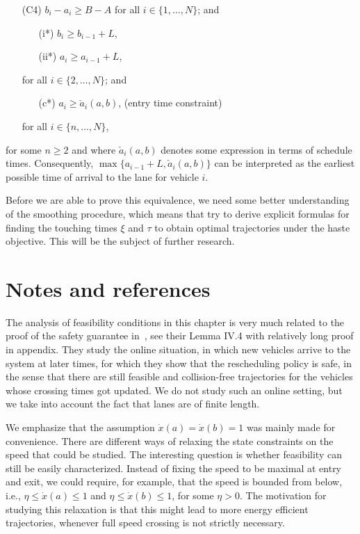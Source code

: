 \documentclass[a4paper]{report}
\theoremstyle{definition}
\theoremstyle{plain}
\begin{document}
\begin{enumerate}[leftmargin=3em]
  \item[(C4)] $b_{i} - a_{i} \geq B-A$ for all $i \in \{1, \dots, N\}$; and
  \begin{enumerate}[leftmargin=4em,midpenalty=10]
    \item[(i*)\quad] $b_{i} \geq b_{i-1} + L$,
    \item[(ii*)\quad] $a_{i} \geq a_{i-1} + L$,
  \end{enumerate}
  \TabPositions{3cm}
  for all $i \in \{2, \dots, N\}$; and
  \begin{enumerate}[leftmargin=4em,midpenalty=10]
    \item[(c*)\quad] $a_{i} \geq \check{a}_i(a,b)$, \tab (entry time constraint)
  \end{enumerate}
  for all $i \in \{n, \dots, N \}$,
\end{enumerate}
for some $n \geq 2$ and where $\check{a}_{i}(a,b)$ denotes some expression in terms of
schedule times. Consequently, $\max\{a_{i-1} + L, \check{a}_{i}(a,b)\}$ can be
interpreted as the earliest possible time of arrival to the lane for vehicle
$i$.

Before we are able to prove this equivalence, we need some better understanding
of the smoothing procedure, which means that try to derive explicit formulas for
finding the touching times $\xi$ and $\tau$ to obtain optimal trajectories under
the haste objective.
%
This will be the subject of further research.


\section{Notes and references}

The analysis of feasibility conditions in this chapter is very much related to
the proof of the safety guarantee in~\cite{miculescuPollingsystemsbasedAutonomousVehicle2016}, see their Lemma IV.4 with
relatively long proof in appendix.
%
They study the online situation, in which new vehicles arrive to the system at
later times, for which they show that the rescheduling policy is safe, in the
sense that there are still feasible and collision-free trajectories for the
vehicles whose crossing times got updated.
%
We do not study such an online setting, but we take into account the fact that
lanes are of finite length.

We emphasize that the assumption $\dot{x}(a) = \dot{x}(b) = 1$ was mainly made
for convenience.
%
There are different ways of relaxing the state constraints on the speed that
could be studied.
%
The interesting question is whether feasibility can still be easily characterized.
%
Instead of fixing the speed to be maximal at entry and exit, we could require,
for example, that the speed is bounded from below, i.e., $\eta \leq \dot{x}(a) \leq 1$
and $\eta \leq \dot{x}(b) \leq 1$, for some $\eta > 0$.
%
The motivation for studying this relaxation is that this might lead to more
energy efficient trajectories, whenever full speed crossing is not strictly
necessary.
\end{document}

